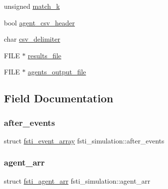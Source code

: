 \begin{DoxyCompactItemize}
unsigned \mbox{\hyperlink{structfsti__simulation_abbe99680ea150fa87b562f12fed6a088}{match\+\_\+k}}
\item 
bool \mbox{\hyperlink{structfsti__simulation_a27584b4efd761d93248a3e1ef9a7e503}{agent\+\_\+csv\+\_\+header}}
\item 
char \mbox{\hyperlink{structfsti__simulation_a2be9818c9a2ba151f4ffaafda2768477}{csv\+\_\+delimiter}}
\item 
F\+I\+LE $\ast$ \mbox{\hyperlink{structfsti__simulation_aee76cdc2d8e408930d2801b9d6099c51}{results\+\_\+file}}
\item 
F\+I\+LE $\ast$ \mbox{\hyperlink{structfsti__simulation_ab9a74be6298bbfe4ea5d2bbdbeef3b95}{agents\+\_\+output\+\_\+file}}
\end{DoxyCompactItemize}


\subsection{Field Documentation}
\mbox{\label{structfsti__simulation_aeecb9bdd114d396d70dcb274eada625c}} 
\subsubsection{\texorpdfstring{after\+\_\+events}{after\_events}}
{\footnotesize\ttfamily struct \mbox{\hyperlink{structfsti__event__array}{fsti\+\_\+event\+\_\+array}} fsti\+\_\+simulation\+::after\+\_\+events}

\mbox{\label{structfsti__simulation_a897c352e69c8a3bd46c1a602d6380750}} 
\subsubsection{\texorpdfstring{agent\+\_\+arr}{agent\_arr}}
{\footnotesize\ttfamily struct \mbox{\hyperlink{structfsti__agent__arr}{fsti\+\_\+agent\+\_\+arr}} fsti\+\_\+simulation\+::agent\+\_\+arr}

\mbox{\label{structfsti__simulation_a27584b4efd761d93248a3e1ef9a7e503}} 
